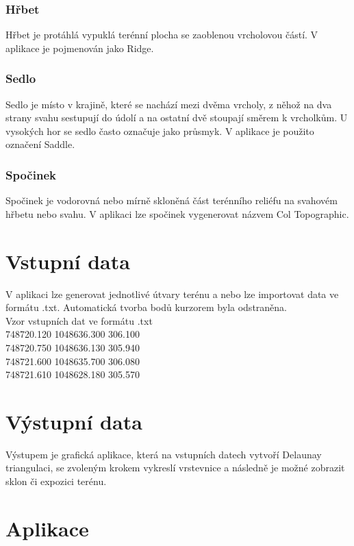 \documentclass[a4paper, 12pt]{article}
\begin{document}
\subsubsection{Hřbet}
Hřbet je protáhlá vypuklá terénní plocha se zaoblenou vrcholovou částí. V aplikace je pojmenován jako Ridge.

\subsubsection{Sedlo}
Sedlo je místo v krajině, které se nachází mezi dvěma vrcholy, z něhož na dva strany svahu sestupují do údolí a na ostatní dvě stoupají směrem k vrcholkům. U vysokých hor se sedlo často označuje jako průsmyk. V aplikace je použito označení Saddle.

\subsubsection{Spočinek}
Spočinek je vodorovná nebo mírně skloněná část terénního reliéfu na svahovém hřbetu nebo svahu. V aplikaci lze spočinek vygenerovat názvem Col Topographic.



\section{Vstupní data}
V aplikaci lze generovat jednotlivé útvary terénu a nebo lze importovat data ve formátu .txt. Automatická tvorba bodů kurzorem byla odstraněna.\\

Vzor vstupních dat ve formátu .txt\\
 748720.120    1048636.300     306.100\\
 748720.750    1048636.130     305.940\\
 748721.600    1048635.700     306.080\\
 748721.610    1048628.180     305.570\\

\section{Výstupní data}
Výstupem je grafická aplikace, která na vstupních datech vytvoří Delaunay triangulaci, se zvoleným krokem vykreslí vrstevnice a následně je možné zobrazit sklon či expozici terénu. 

\clearpage
\section{Aplikace}
\end{document}
